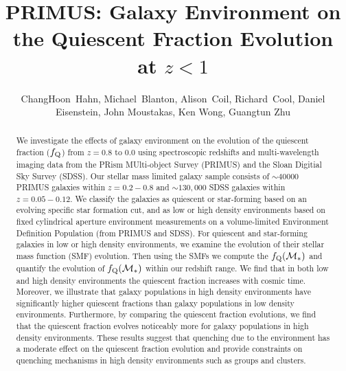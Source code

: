 \documentclass{emulateapj}
\begin{document}
\title{PRIMUS: Galaxy Environment on the Quiescent Fraction Evolution at $z < 1$}
\author{
ChangHoon~Hahn, 
Michael~Blanton, 
Alison~Coil, 
Richard~Cool, 
Daniel Eisenstein,
John Moustakas, 
Ken Wong, 
Guangtun Zhu
}
\begin{abstract}
We investigate the effects of galaxy environment on the evolution of the quiescent fraction ($f_{\rm{Q}}$) from $z =0.8 $ to $ 0.0$ using spectroscopic redshifts and multi-wavelength imaging data from the PRism MUlti-object Survey (PRIMUS) and the Sloan Digitial Sky Survey (SDSS). Our stellar mass limited galaxy sample consists of $\sim 40000$ PRIMUS galaxies within $z = 0.2-0.8$ and $\sim 130,000$ SDSS galaxies within $z = 0.05-0.12$. We classify the galaxies as quiescent or star-forming based on an evolving specific star formation cut, and as low or high density environments based on fixed cylindrical aperture environment measurements on a volume-limited Environment Definition Population (from PRIMUS and SDSS). For quiescent and star-forming galaxies in low or high density environments, we examine the evolution of their stellar mass function (SMF) evolution. Then using the SMFs we compute the $f_{\rm{Q}}(\mathcal{M}_{*})$ and quantify the evolution of $f_{\rm{Q}}(\mathcal{M}_{*})$ within our redshift range. We find that in both low and high density environments the quiescent fraction increases with cosmic time. Moreover, we illustrate that galaxy populations in high density environments have significantly higher quiescent fractions than galaxy populations in low density environments. Furthermore, by comparing the quiescent fraction evolutions, we find that the quiescent fraction evolves noticeably more for galaxy populations in high density environments. These results suggest that quenching due to the environment has a moderate effect on the quiescent fraction evolution and provide constraints on quenching mechanisms in high density environments such as groups and clusters. 
\end{abstract}
\end{document}
